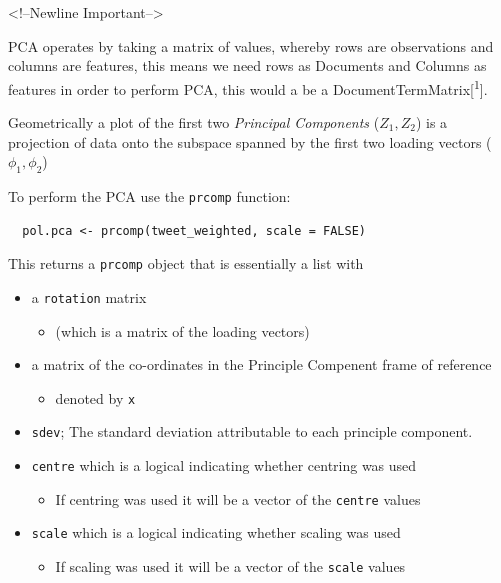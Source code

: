 \documentclass[11pt]{article}
\begin{document}
\begin{HTML}
<!--Newline Important-->
\end{HTML}

PCA operates by taking a matrix of values, whereby rows are observations
and columns are features, this means we need rows as Documents and
Columns as features in order to perform PCA, this would a be a
DocumentTermMatrix[\textsuperscript{1}].

Geometrically a plot of the first two \emph{Principal Components}
(\(Z_1, Z_2\)) is a projection of data onto the subspace spanned by the
first two loading vectors (\(\phi_1, \phi_2\))

To perform the PCA use the \texttt{prcomp} function:

\begin{verbatim}
  pol.pca <- prcomp(tweet_weighted, scale = FALSE)
\end{verbatim}

This returns a \texttt{prcomp} object that is essentially a list with

\begin{itemize}
\item a \texttt{rotation} matrix

\begin{itemize}
\item (which is a matrix of the loading vectors)
\end{itemize}

\item a matrix of the co-ordinates in the Principle Compenent frame of
reference

\begin{itemize}
\item denoted by \texttt{x}
\end{itemize}

\item \texttt{sdev}; The standard deviation attributable to each principle
component.
\item \texttt{centre} which is a logical indicating whether centring was used

\begin{itemize}
\item If centring was used it will be a vector of the \texttt{centre} values
\end{itemize}

\item \texttt{scale} which is a logical indicating whether scaling was used

\begin{itemize}
\item If scaling was used it will be a vector of the \texttt{scale} values
\end{itemize}
\end{itemize}
\end{document}
